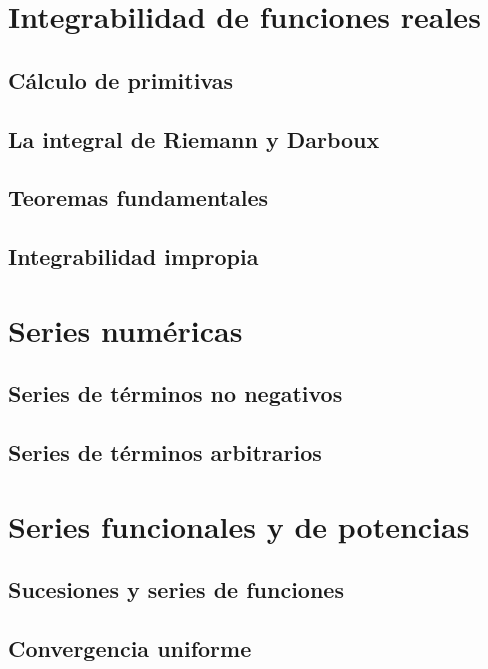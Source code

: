 \documentclass{article}
\begin{document}
\newpage
\section{Integrabilidad de funciones reales}

\subsection{Cálculo de primitivas}

\subsection{La integral de Riemann y Darboux}

\subsection{Teoremas fundamentales}

\subsection{Integrabilidad impropia}





\section{Series numéricas}

\subsection{Series de términos no negativos}

\subsection{Series de términos arbitrarios}





\section{Series funcionales y de potencias}

\subsection{Sucesiones y series de funciones}

\subsection{Convergencia uniforme}
\end{document}
